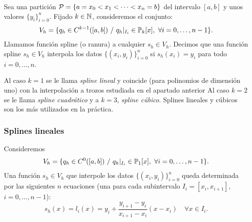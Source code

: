\begin{definition}
  \label{def:funcion-spline}
  Sea una partición ${\cal P}= \{a = x_0 <x_1 < \cdots <x_n=b\}$ del
  intervalo $[a,b]$ y unos valores $\{y_i\}_{i=0}^n$. Fijado
  $k\in\operatorname{{\mathbb N}}$, consideremos el conjunto:
  \begin{equation*}
    V_h = \{q_h \in C^{k-1}([a,b])\ / \ q_h|_{I_i}\in  \operatorname{{\mathbb P}}_k[x],\ \forall i=0,\dots,n-1\}.
\end{equation*}
Llamamos función spline (o ranura) a cualquier $s_h\in V_h$. Decimos que una
función spline $s_h\in V_h$ interpola los datos $\{(x_i,y_i)\}_{i=0}^n$
si $s_h(x_i)=y_i$ para todo $i=0,\dots,n$.
\end{definition}

Al caso $k=1$ se le llama \textit{spline lineal} y coincide (para
polinomios de dimensión uno) con la interpolación a trozos estudiada
en el apartado anterior Al caso $k=2$ se le llama \textit{spline
  cuadrático} y a $k=3$, \textit{spline cúbico}. Splines lineales y
cúbicos son los más utilizados en la práctica.

\subsubsection{Splines lineales}
\label{sec:splines-lineales}

Consideremos
\begin{equation*}
  V_h = \{q_h \in C^{0}([a,b])\ / \ q_h|_{I_i}\in  \operatorname{{\mathbb P}}_1[x],\ \forall i=0,\dots,n-1\}.
\end{equation*}
Una función $s_h\in V_h$ que interpole los datos
$\{(x_i,y_i)\}_{i=0}^n$ queda determinada por las siguientes $n$
ecuaciones (una para cada subintervalo $I_i=[x_i, x_{i+1}]$,
$i=0,\dots,n-1$):
\begin{equation*}
  \label{eq:splines-lineales-1}
  s_h(x) = l_i(x) = y_i + \frac{y_{i+1}-y_i}{x_{i+1}-x_i}(x-x_i) \quad
  \forall x\in I_i.
\end{equation*}

